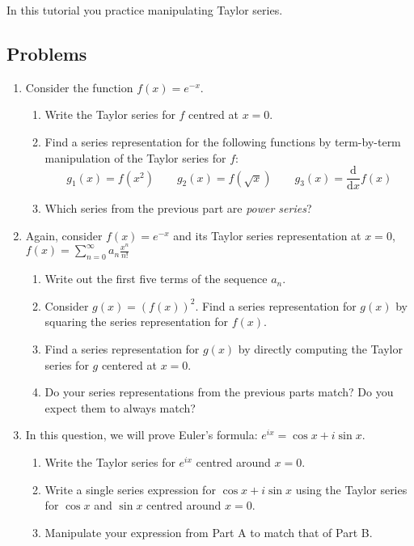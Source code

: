 		\begin{objectives}
			In this tutorial you practice manipulating Taylor series.
		\end{objectives}

\subsection*{Problems}




\begin{enumerate}
    \item Consider the function $f(x)=e^{-x}$. 
    
    \begin{enumerate}
        \item Write the Taylor series for $f$ centred at $x=0$.
        \item Find a series representation for the following functions by term-by-term manipulation of the Taylor series for $f$:
        \[
            g_1(x)=f(x^2)\qquad g_2(x)=f(\sqrt{x})\qquad g_3(x)=\frac{\mathrm d}{\mathrm d x}f(x)
        \]
        \item Which series from the previous part are \emph{power series}?

    \end{enumerate}

    \item Again, consider $f(x)=e^{-x}$ and its Taylor series representation at $x=0$,
    $\displaystyle f(x)= \sum_{n=0}^\infty a_n \frac{x^n}{n!}$
    \begin{enumerate}
        \item Write out the first five terms of the sequence $a_n$.
        \item Consider $g(x)=(f(x))^2$.  Find a series representation for $g(x)$ by squaring the series representation for $f(x)$. 
        \item Find a series representation for $g(x)$ by directly computing the Taylor series for $g$ centered at $x=0$.
        \item Do your series representations from the previous parts match? Do you expect them to always match?
    \end{enumerate}

	\item In this question, we will prove Euler's formula: $e^{ix} = \cos{x} + i\sin{x}$.
    \begin{enumerate}
        \item Write the Taylor series for $e^{ix}$ centred around $x=0$.
        \item Write a single series expression for $\cos{x} + i\sin{x}$ using the Taylor series for $\cos{x}$ and $\sin{x}$ centred around $x=0$.
        \item Manipulate your expression from Part A to match that of Part B.
    \end{enumerate}


\end{enumerate}
